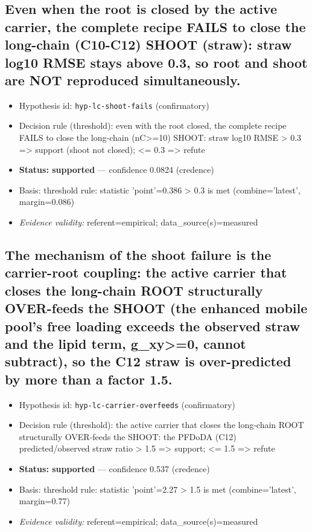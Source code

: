 \documentclass{article}
\begin{document}
\subsection{Even when the root is closed by the active carrier, the complete recipe FAILS to close the long-chain (C10-C12) SHOOT (straw): straw log10 RMSE stays above 0.3, so root and shoot are NOT reproduced simultaneously.}
\begin{itemize}
  \item Hypothesis id: \texttt{hyp-lc-shoot-fails} (confirmatory)
  \item Decision rule (threshold): even with the root closed, the complete recipe FAILS to close the long-chain (nC>=10) SHOOT: straw log10 RMSE > 0.3 => support (shoot not closed); <= 0.3 => refute
  \item \textbf{Status: supported} --- confidence 0.0824 (credence)
  \item Basis: threshold rule: statistic 'point'=0.386 > 0.3 is met (combine='latest', margin=0.086)
  \item \textit{Evidence validity:} referent=empirical; data\_source(s)=measured
\end{itemize}

\subsection{The mechanism of the shoot failure is the carrier-root coupling: the active carrier that closes the long-chain ROOT structurally OVER-feeds the SHOOT (the enhanced mobile pool's free loading exceeds the observed straw and the lipid term, g\_xy>=0, cannot subtract), so the C12 straw is over-predicted by more than a factor 1.5.}
\begin{itemize}
  \item Hypothesis id: \texttt{hyp-lc-carrier-overfeeds} (confirmatory)
  \item Decision rule (threshold): the active carrier that closes the long-chain ROOT structurally OVER-feeds the SHOOT: the PFDoDA (C12) predicted/observed straw ratio > 1.5 => support; <= 1.5 => refute
  \item \textbf{Status: supported} --- confidence 0.537 (credence)
  \item Basis: threshold rule: statistic 'point'=2.27 > 1.5 is met (combine='latest', margin=0.77)
  \item \textit{Evidence validity:} referent=empirical; data\_source(s)=measured
\end{itemize}
\end{document}

